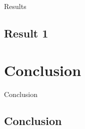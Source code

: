 \documentclass{beamer}
\begin{document}
\begin{frame}[c]
\Huge{\centerline{Results}}
\end{frame}

\subsection{Result 1}
\begin{frame}

\end{frame}

\section{Conclusion}

\begin{frame}[c]
\Huge{\centerline{Conclusion}}
\end{frame}

\subsection{Conclusion}
\begin{frame}

\end{frame}
\end{document}
